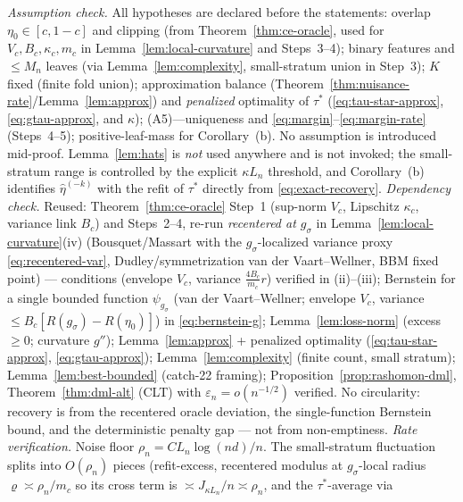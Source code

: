 \begin{remark}
\label{rem:margin-audit}
\emph{Assumption check.} All hypotheses are declared before the statements:
overlap $\eta_0\in[c,1-c]$ and clipping (from Theorem~\ref{thm:ce-oracle}, used
for $V_c,B_c,\kappa_c,m_c$ in Lemma~\ref{lem:local-curvature} and Steps~3--4);
binary features and $\le M_n$ leaves (via Lemma~\ref{lem:complexity}, small-stratum
union in Step~3); $K$ fixed (finite fold union); approximation balance
(Theorem~\ref{thm:nuisance-rate}/Lemma~\ref{lem:approx}) and \emph{penalized}
optimality of $\tau^\ast$ (\eqref{eq:tau-star-approx}, \eqref{eq:gtau-approx}, and
$\kappa$); (A5)---uniqueness and \eqref{eq:margin}--\eqref{eq:margin-rate}
(Steps~4--5); positive-leaf-mass for Corollary~(b). No assumption is introduced
mid-proof. Lemma~\ref{lem:hats} is \emph{not} used anywhere and is not invoked;
the small-stratum range is controlled by the explicit $\kappa L_n$ threshold, and
Corollary~(b) identifies $\hat\eta^{(-k)}$ with the refit of $\tau^\ast$ directly
from \eqref{eq:exact-recovery}.
\emph{Dependency check.} Reused: Theorem~\ref{thm:ce-oracle} Step~1 (sup-norm
$V_c$, Lipschitz $\kappa_c$, variance link $B_c$) and Steps~2--4, re-run
\emph{recentered at $g_\sigma$} in Lemma~\ref{lem:local-curvature}(iv)
(Bousquet/Massart with the $g_\sigma$-localized variance proxy
\eqref{eq:recentered-var}, Dudley/symmetrization van der Vaart--Wellner, BBM
fixed point) --- conditions (envelope $V_c$, variance $\tfrac{4B_c}{m_c}r$)
verified in (ii)--(iii); Bernstein for a single bounded function $\psi_{g_\sigma}$
(van der Vaart--Wellner; envelope $V_c$, variance $\le B_c[R(g_\sigma)-R(\eta_0)]$)
in \eqref{eq:bernstein-g}; Lemma~\ref{lem:loss-norm} (excess $\ge0$; curvature
$g''$); Lemma~\ref{lem:approx} + penalized optimality (\eqref{eq:tau-star-approx},
\eqref{eq:gtau-approx}); Lemma~\ref{lem:complexity} (finite count, small stratum);
Lemma~\ref{lem:best-bounded} (catch-22 framing);
Proposition~\ref{prop:rashomon-dml}, Theorem~\ref{thm:dml-alt} (CLT) with
$\varepsilon_n=o(n^{-1/2})$ verified. No circularity: recovery is from the
recentered oracle deviation, the single-function Bernstein bound, and the
deterministic penalty gap --- not from non-emptiness.
\emph{Rate verification.} Noise floor $\rho_n=CL_n\log(nd)/n$. The small-stratum
fluctuation splits into $O(\rho_n)$ pieces (refit-excess, recentered modulus at
$g_\sigma$-local radius $\varrho\asymp\rho_n/m_c$ so its cross term is
$\asymp J_{\kappa L_n}/n\asymp\rho_n$, and the $\tau^\ast$-average via

\end{remark}
